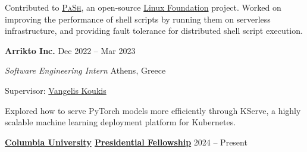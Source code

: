 \documentclass[margin,11pt]{resume}
\newcommand{\descriptionVSpace}{\vspace{0.5ex}\xspace}
\newcommand{\subsectionVSpace}{\vspace{4.5ex}\xspace}
\newcommand{\sectionVSpace}{\vspace{1ex}\xspace} %
\newcommand{\fellowshipVSpace}{\vspace{2ex}\xspace} %
\newcommand{\pash}{\textsc{PaSh}\xspace}
\newcommand{\header}[1]{\textbf{#1}\xspace}
\newcommand{\company}[1]{\header{#1}\xspace}
\newcommand{\fellowship}[1]{\header{#1}\xspace}
\newcommand{\interval}[2]{#1 -- #2\xspace}
\newcommand{\place}[1]{#1\xspace}
\newcommand{\jobRole}[1]{\textit{#1}\xspace}
\newcommand{\stitle}[1]{#1:\xspace}
\newlength{\cvsectionbodyoffset}
\newlength{\cvsectionwidestheaderwidth}
\newcommand{\recordCvSectionHeaderWidth}{%
	\ifdim\wd\cvsectionheaderbox>\cvsectionwidestheaderwidth
		\global\cvsectionwidestheaderwidth=\wd\cvsectionheaderbox
	\fi
}
\newcommand{\entryNeedspace}{\par\Needspace{2\baselineskip}}
\newenvironment{fellowshipItem}{\entryNeedspace}{\par\fellowshipVSpace} %
\newenvironment{jobDuties}{\descriptionVSpace}{\par}
\newenvironment{rSection}[1]{%
	\par
	\setCvSectionHeader{#1}%
	\recordCvSectionHeaderWidth%
	\begin{list}{}{%
		\setlength{\leftmargin}{\cvsectionbodyoffset}%
		\setlength{\rightmargin}{0pt}%
		\setlength{\labelwidth}{\cvsectionbodyoffset}%
		\setlength{\labelsep}{0pt}%
		\setlength{\itemindent}{0pt}%
		\setlength{\listparindent}{0pt}%
		\setlength{\topsep}{0pt}%
		\setlength{\partopsep}{0pt}%
		\setlength{\parsep}{0pt}%
		\setlength{\itemsep}{0pt}%
		\renewcommand{\makelabel}[1]{\makebox[\labelwidth][l]{\raisebox{0pt}[0pt][0pt]{##1}}}%
	}%
	\item[\usebox{\cvsectionheaderbox}]%
}{\end{list}\sectionVSpace\par}
\newenvironment{rSubsection}{\entryNeedspace}{\par\subsectionVSpace}
\begin{document}
\begin{resume}
\begin{rSection}{Experience}
\begin{rSubsection}
			\begin{jobDuties}
				Contributed to \href{https://binpa.sh}{\pash}, an open-source \href{https://www.linuxfoundation.org/press/press-release/linux-foundation-to-host-the-pash-project-accelerating-shell-scripting-with-automated-parallelization-for-industrial-use-cases}{Linux Foundation} project.
				Worked on improving the performance of shell scripts by running them on serverless infrastructure, and providing fault tolerance for distributed shell script execution.
			\end{jobDuties}
		\end{rSubsection}





		\begin{rSubsection}
			\company{Arrikto Inc.} \hfill \interval{Dec 2022}{Mar 2023}

			\jobRole{Software Engineering Intern} \hfill \place{Athens, Greece}

			\stitle{Supervisor} \href{https://www.linkedin.com/in/vkoukis/}{Vangelis Koukis}

			\begin{jobDuties}
				Explored how to serve PyTorch models more efficiently through KServe, a highly scalable machine learning deployment platform for Kubernetes.
			\end{jobDuties}
		\end{rSubsection}
	\end{rSection}


	\begin{rSection}{Awards}
		\begin{fellowshipItem}
			\fellowship{\href{https://www.cs.columbia.edu/2024/meet-the-scholars-phd-students-with-prestigious-fellowships/}{Columbia University} \href{https://www.cs.columbia.edu/2026/phd-students-recognized-with-top-fellowships/}{Presidential Fellowship}} \hfill \interval{2024}{Present}
		\end{fellowshipItem}


\end{rSection}
\end{resume}
\end{document}
